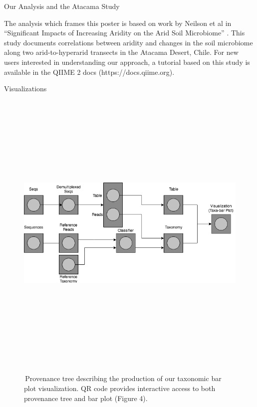 \documentclass[final]{beamer}
\newlength{\colwidth}
\begin{document}
\begin{frame}[t]
\begin{columns}[t]
\begin{column}{\colwidth}
  \begin{block}{Our Analysis and the Atacama Study}
    \begin{tcolorbox}
    The analysis which frames this poster is based on work by Neilson et al in
    “Significant Impacts of Increasing Aridity on the Arid Soil Microbiome”
    \cite{Neilsone00195-16}. This study documents correlations between aridity
    and changes in the soil microbiome along two arid-to-hyperarid transects in
    the Atacama Desert, Chile. For new users interested in understanding
    our approach, a tutorial based on this study is available in the
    QIIME 2 docs (https://docs.qiime.org).
    \end{tcolorbox}
  \end{block}


  \begin{block}{Visualizations}
    \begin{figure}[tph!]
      {\includegraphics[height=14cm]{assets/provenance}}
      \caption{\,Provenance tree describing the production of our taxonomic bar plot visualization. QR code provides interactive access to both provenance tree and bar plot (Figure 4).}
      \label{fig:provenance}
    \end{figure}


\end{block}
\end{column}
\end{columns}
\end{frame}
\end{document}

